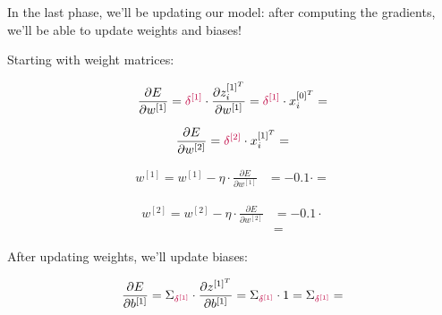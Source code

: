 \documentclass[12pt]{article}
\begin{document}
\begin{enumerate}[leftmargin=\labelsep]
        In the last phase, we'll be updating our model: after computing the gradients,
        we'll be able to update weights and biases!

        Starting with weight matrices:

        \begin{equation*}
          \frac{\partial E}{\partial w^{[1]}} = \textcolor{purple}{\delta^{[1]}} \cdot
          \frac{\partial z_i^{[1]^T}}{\partial w^{[1]}}
          = \textcolor{purple}{\delta^{[1]}} \cdot x_i^{[0]^T}
          = 
        \end{equation*}

        \begin{equation*}
          \frac{\partial E}{\partial w^{[2]}}
          = \textcolor{purple}{\delta^{[2]}}
          \cdot x_i^{[1]^T}
          = 
        \end{equation*}

        \begin{equation*}
          \begin{aligned}
            w^{[1]} = w^{[1]} - \eta \cdot \frac{\partial E}{\partial w^{[1]}}
             & =  - 0.1 \cdot 
            = 
          \end{aligned}
        \end{equation*}

        \begin{equation*}
          \begin{aligned}
            w^{[2]} = w^{[2]} - \eta \cdot \frac{\partial E}{\partial w^{[2]}}
             & =  - 0.1 \cdot  \\
             & = 
          \end{aligned}
        \end{equation*}

        After updating weights, we'll update biases:

        \begin{equation*}
          \frac{\partial E}{\partial b^{[1]}} = \Sigma_{\textcolor{purple}{\delta^{[1]}}} \cdot
          \frac{\partial z^{[1]^T}}{\partial b^{[1]}}
          = \Sigma_{\textcolor{purple}{\delta^{[1]}}} \cdot 1
          = \Sigma_{\textcolor{purple}{\delta^{[1]}}}
          = 
        \end{equation*}


\end{enumerate}
\end{document}
